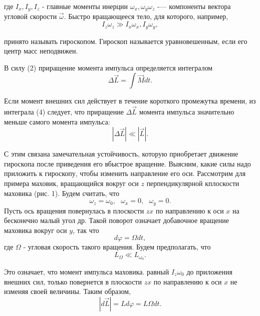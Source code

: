 где $I_x, I_y, I_z$ - главные моменты инерции
$\omega_x, \omega_y \omega_z$ -— компоненты вектора угловой
скорости $\vec\omega$. Быстро вращающееся тело, для которого,
например,
\begin{equation*}
    I_z\omega_z \gg I_x\omega_x, I_y\omega_y,
\end{equation*}

принято называть гироскопом. Гироскоп называется уравновешенным,
если его центр масс неподвижен.

В силу (2) приращение момента импульса определяется интегралом
\begin{equation}
    \Delta\vec{L} =\int\vec{M}dt.
\end{equation}

Если момент внешних сил действует в течение короткого промежутка
времени, из интеграла (4) следует, что приращение $\Delta\vec{L}$
момента импульса значительно меньше самого момента импульса:
\begin{equation*}
    |\Delta\vec{L}| \ll |\vec{L}|.
\end{equation*}


С этим связана замечательная устойчивость, которую приобретает
движение гироскопа после приведения его вбыстрое вращение. Выясним,
какие силы надо приложить к гироскопу, чтобы изменить направление
его оси. Рассмотрим для примера маховик, вращающийся вокруг оси $z$
перпендикулярной кплоскости маховика (рис. 1). Будем считать, что
\begin{equation*}
    \omega_z = \omega_0,\text{     }\omega_x = 0,\text{     }\omega_y = 0.
\end{equation*}
Пусть ось вращения повернулась в плоскости $zx$ по направлению к
оси $x$ на бесконечно малый угол др. Такой поворот означает
добавочное вращение маховика вокруг оси $y$, так что
\begin{equation*}
    d\varphi = \Omega dt,
\end{equation*}
где $\Omega$ - угловая скорость такого вращения. Будем
предполагать, что
\begin{equation}
    L_\Omega \ll L_{\omega_0}.
\end{equation}

Это означает, что момент импульса маховика. равный $I_z\omega_0$
до приложения внешних сил, только повернется в плоскости $zx$ по
направлению к оси $x$ не изменяя своей величины. Таким образом,
\begin{equation*}
    |d\vec{L}| = Ld\varphi = L\Omega dt.
\end{equation*}


